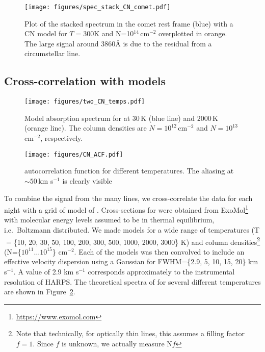 \documentclass{aa}
\newcommand{\kms}{km s$^{-1}$}
\begin{document}
\begin{figure}
    \begin{centering}
        \texttt{[image: figures/spec\_stack\_CN\_comet.pdf]}
        \caption{Plot of the stacked spectrum in the comet rest frame (blue) with a CN model for $T=$300K and N=10$^{14}$\,cm$^{-2}$ overplotted in orange. The large signal around 3860\AA{} is due to the residual from a circumstellar  line.}
        \label{fig:spec_CN_comet_frame}
    \end{centering}
\end{figure}

\subsection{Cross-correlation with \texorpdfstring{}{CN} models}\label{sect:CCF}

\begin{figure}
    \begin{centering}
        \texttt{[image: figures/two\_CN\_temps.pdf]}
        \caption{Model absorption spectrum for  at 30\,K (blue line) and 2000\,K (orange line). The  column densities are $N=10^{12}$\,cm$^{-2}$ and $N=10^{13}$\,cm$^{-2}$, respectively. }
        \label{fig:CN_theory}
    \end{centering}
\end{figure}

\begin{figure}
    \begin{centering}
        \texttt{[image: figures/CN\_ACF.pdf]}
        \caption{ autocorrelation function for different temperatures. The aliasing at $\sim50$\,\kms{} is clearly visible}
        \label{fig:CN_ACF}
    \end{centering}
\end{figure}

To combine the signal from the many  lines, we cross-correlate the data for each night with a grid of model of .
%
Cross-sections for  were obtained from ExoMol\footnote{\url{https://www.exomol.com}} \citep{Tennyson12,Tennyson16,Brooke14} with molecular energy levels assumed to be in thermal equilibrium, i.e.\ Boltzmann distributed.
%
We made models for a wide range of temperatures (T$=$\{10, 20, 30, 50, 100, 200, 300, 500, 1000, 2000, 3000\} K) and column densities\footnote{Note that technically, for optically thin lines, this assumes a filling factor $f=1$.
%
Since $f$ is unknown, we actually measure N$f$} (N=\{$10^{11} \ldots 10^{15}$\} cm$^{-2}$.
%
Each of the models was then convolved to include an effective velocity dispersion using a Gaussian for FWHM=\{2.9, 5, 10, 15, 20\} \kms{}.
%
A value of 2.9 \kms{} corresponds approximately to the instrumental resolution of HARPS.
%
The theoretical spectra of  for several different temperatures are shown in Figure~\ref{fig:CN_theory}.
\end{document}
